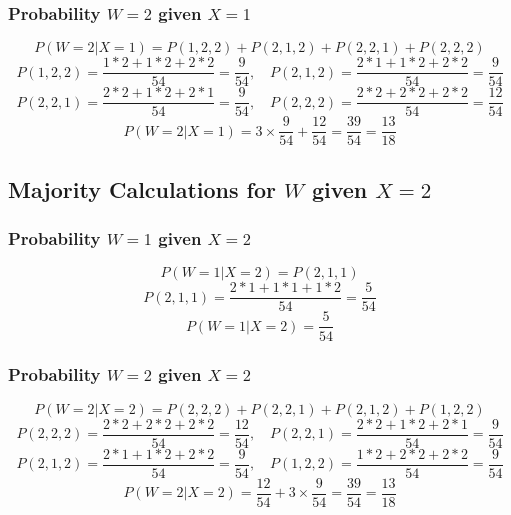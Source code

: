 \documentclass[12pt]{article}
\begin{document}
\subsubsection*{Probability \( W = 2 \) given \( X = 1 \)}
\[
P(W = 2 | X = 1) = P(1, 2, 2) + P(2, 1, 2) + P(2, 2, 1) + P(2, 2, 2)
\]
\[
P(1, 2, 2) = \frac{1*2 + 1*2 + 2*2}{54} = \frac{9}{54}, \quad
P(2, 1, 2) = \frac{2*1 + 1*2 + 2*2}{54} = \frac{9}{54}
\]
\[
P(2, 2, 1) = \frac{2*2 + 1*2 + 2*1}{54} = \frac{9}{54}, \quad
P(2, 2, 2) = \frac{2*2 + 2*2 + 2*2}{54} = \frac{12}{54}
\]
\[
P(W = 2 | X = 1) = 3 \times \frac{9}{54} + \frac{12}{54} = \frac{39}{54} = \frac{13}{18}
\]

\subsection*{Majority Calculations for \( W \) given \( X = 2 \)}
\subsubsection*{Probability \( W = 1 \) given \( X = 2 \)}
\[
P(W = 1 | X = 2) = P(2, 1, 1)
\]
\[
P(2, 1, 1) = \frac{2*1 + 1*1 + 1*2}{54} = \frac{5}{54}
\]
\[
P(W = 1 | X = 2) = \frac{5}{54}
\]

\subsubsection*{Probability \( W = 2 \) given \( X = 2 \)}
\[
P(W = 2 | X = 2) = P(2, 2, 2) + P(2, 2, 1) + P(2, 1, 2) + P(1, 2, 2)
\]
\[
P(2, 2, 2) = \frac{2*2 + 2*2 + 2*2}{54} = \frac{12}{54}, \quad
P(2, 2, 1) = \frac{2*2 + 1*2 + 2*1}{54} = \frac{9}{54}
\]
\[
P(2, 1, 2) = \frac{2*1 + 1*2 + 2*2}{54} = \frac{9}{54}, \quad
P(1, 2, 2) = \frac{1*2 + 2*2 + 2*2}{54} = \frac{9}{54}
\]
\[
P(W = 2 | X = 2) = \frac{12}{54} + 3 \times \frac{9}{54} = \frac{39}{54} = \frac{13}{18}
\]
\end{document}
